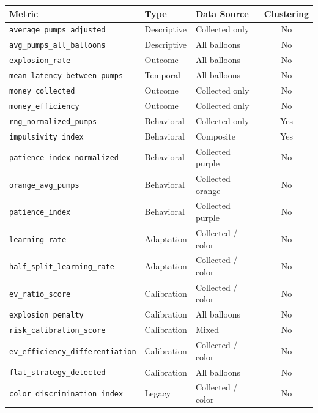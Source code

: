 \documentclass[11pt,a4paper]{article}
\begin{document}
{%
\scriptsize
\setlength{\tabcolsep}{4pt}
\begin{longtable}{@{}>{\raggedright\arraybackslash}p{4.8cm}llc@{}}
\toprule
\textbf{Metric} & \textbf{Type} & \textbf{Data Source} & \textbf{Clustering} \\
\midrule
\endhead
\texttt{average\_pumps\_adjusted}          & Descriptive & Collected only    & No \\
\texttt{avg\_pumps\_all\_balloons}         & Descriptive & All balloons      & No \\
\texttt{explosion\_rate}                   & Outcome     & All balloons      & No \\
\texttt{mean\_latency\_between\_pumps}     & Temporal    & All balloons      & No \\
\texttt{money\_collected}                  & Outcome     & Collected only    & No \\
\texttt{money\_efficiency}                 & Outcome     & Collected only    & No \\
\texttt{rng\_normalized\_pumps}            & Behavioral  & Collected only    & Yes \\
\texttt{impulsivity\_index}                & Behavioral  & Composite         & Yes \\
\texttt{patience\_index\_normalized}       & Behavioral  & Collected purple  & No \\
\texttt{orange\_avg\_pumps}                & Behavioral  & Collected orange  & No \\
\texttt{patience\_index}                   & Behavioral  & Collected purple  & No \\
\texttt{learning\_rate}                    & Adaptation  & Collected / color & No \\
\texttt{half\_split\_learning\_rate}       & Adaptation  & Collected / color & No \\
\texttt{ev\_ratio\_score}                  & Calibration & Collected / color & No \\
\texttt{explosion\_penalty}                & Calibration & All balloons      & No \\
\texttt{risk\_calibration\_score}          & Calibration & Mixed             & No \\
\texttt{ev\_efficiency\_differentiation}   & Calibration & Collected / color & No \\
\texttt{flat\_strategy\_detected}          & Calibration & All balloons      & No \\
\texttt{color\_discrimination\_index}      & Legacy      & Collected / color & No \\

\end{longtable}}
\end{document}
